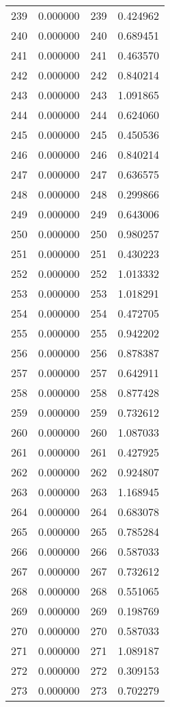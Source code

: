 \documentclass[12pt]{article}
\begin{document}
\begin{longtable}{@{}cccc@{}}
239 & 0.000000 & 239 & 0.424962 \\
240 & 0.000000 & 240 & 0.689451 \\
241 & 0.000000 & 241 & 0.463570 \\
242 & 0.000000 & 242 & 0.840214 \\
243 & 0.000000 & 243 & 1.091865 \\
244 & 0.000000 & 244 & 0.624060 \\
245 & 0.000000 & 245 & 0.450536 \\
246 & 0.000000 & 246 & 0.840214 \\
247 & 0.000000 & 247 & 0.636575 \\
248 & 0.000000 & 248 & 0.299866 \\
249 & 0.000000 & 249 & 0.643006 \\
250 & 0.000000 & 250 & 0.980257 \\
251 & 0.000000 & 251 & 0.430223 \\
252 & 0.000000 & 252 & 1.013332 \\
253 & 0.000000 & 253 & 1.018291 \\
254 & 0.000000 & 254 & 0.472705 \\
255 & 0.000000 & 255 & 0.942202 \\
256 & 0.000000 & 256 & 0.878387 \\
257 & 0.000000 & 257 & 0.642911 \\
258 & 0.000000 & 258 & 0.877428 \\
259 & 0.000000 & 259 & 0.732612 \\
260 & 0.000000 & 260 & 1.087033 \\
261 & 0.000000 & 261 & 0.427925 \\
262 & 0.000000 & 262 & 0.924807 \\
263 & 0.000000 & 263 & 1.168945 \\
264 & 0.000000 & 264 & 0.683078 \\
265 & 0.000000 & 265 & 0.785284 \\
266 & 0.000000 & 266 & 0.587033 \\
267 & 0.000000 & 267 & 0.732612 \\
268 & 0.000000 & 268 & 0.551065 \\
269 & 0.000000 & 269 & 0.198769 \\
270 & 0.000000 & 270 & 0.587033 \\
271 & 0.000000 & 271 & 1.089187 \\
272 & 0.000000 & 272 & 0.309153 \\
273 & 0.000000 & 273 & 0.702279 \\

\end{longtable}
\end{document}
